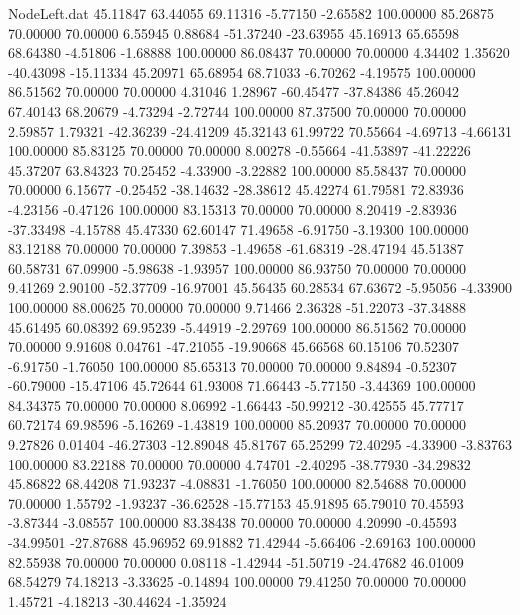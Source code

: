 \begin{filecontents}{NodeLeft.dat}
  45.11847   63.44055   69.11316    -5.77150   -2.65582  100.00000   85.26875   70.00000   70.00000    6.55945    0.88684  -51.37240  -23.63955
  45.16913   65.65598   68.64380    -4.51806   -1.68888  100.00000   86.08437   70.00000   70.00000    4.34402    1.35620  -40.43098  -15.11334
  45.20971   65.68954   68.71033    -6.70262   -4.19575  100.00000   86.51562   70.00000   70.00000    4.31046    1.28967  -60.45477  -37.84386
  45.26042   67.40143   68.20679    -4.73294   -2.72744  100.00000   87.37500   70.00000   70.00000    2.59857    1.79321  -42.36239  -24.41209
  45.32143   61.99722   70.55664    -4.69713   -4.66131  100.00000   85.83125   70.00000   70.00000    8.00278   -0.55664  -41.53897  -41.22226
  45.37207   63.84323   70.25452    -4.33900   -3.22882  100.00000   85.58437   70.00000   70.00000    6.15677   -0.25452  -38.14632  -28.38612
  45.42274   61.79581   72.83936    -4.23156   -0.47126  100.00000   83.15313   70.00000   70.00000    8.20419   -2.83936  -37.33498   -4.15788
  45.47330   62.60147   71.49658    -6.91750   -3.19300  100.00000   83.12188   70.00000   70.00000    7.39853   -1.49658  -61.68319  -28.47194
  45.51387   60.58731   67.09900    -5.98638   -1.93957  100.00000   86.93750   70.00000   70.00000    9.41269    2.90100  -52.37709  -16.97001
  45.56435   60.28534   67.63672    -5.95056   -4.33900  100.00000   88.00625   70.00000   70.00000    9.71466    2.36328  -51.22073  -37.34888
  45.61495   60.08392   69.95239    -5.44919   -2.29769  100.00000   86.51562   70.00000   70.00000    9.91608    0.04761  -47.21055  -19.90668
  45.66568   60.15106   70.52307    -6.91750   -1.76050  100.00000   85.65313   70.00000   70.00000    9.84894   -0.52307  -60.79000  -15.47106
  45.72644   61.93008   71.66443    -5.77150   -3.44369  100.00000   84.34375   70.00000   70.00000    8.06992   -1.66443  -50.99212  -30.42555
  45.77717   60.72174   69.98596    -5.16269   -1.43819  100.00000   85.20937   70.00000   70.00000    9.27826    0.01404  -46.27303  -12.89048
  45.81767   65.25299   72.40295    -4.33900   -3.83763  100.00000   83.22188   70.00000   70.00000    4.74701   -2.40295  -38.77930  -34.29832
  45.86822   68.44208   71.93237    -4.08831   -1.76050  100.00000   82.54688   70.00000   70.00000    1.55792   -1.93237  -36.62528  -15.77153
  45.91895   65.79010   70.45593    -3.87344   -3.08557  100.00000   83.38438   70.00000   70.00000    4.20990   -0.45593  -34.99501  -27.87688
  45.96952   69.91882   71.42944    -5.66406   -2.69163  100.00000   82.55938   70.00000   70.00000    0.08118   -1.42944  -51.50719  -24.47682
  46.01009   68.54279   74.18213    -3.33625   -0.14894  100.00000   79.41250   70.00000   70.00000    1.45721   -4.18213  -30.44624   -1.35924

\end{filecontents}

